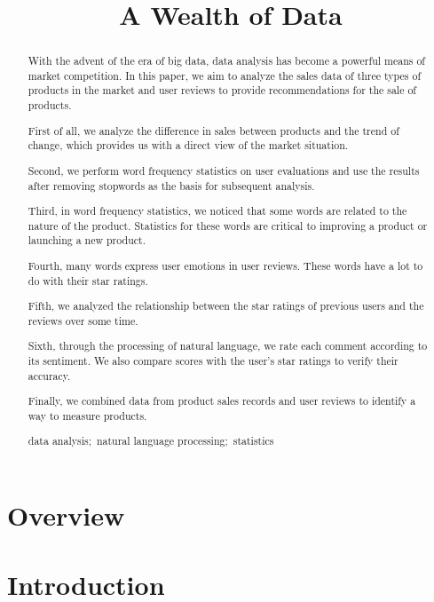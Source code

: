 \documentclass{mcmthesis}
\title{A Wealth of Data}
\begin{document}
	\begin{abstract}
		
		With the advent of the era of big data, data analysis has become a powerful means of market competition. In this paper, we aim to analyze the sales data of three types of products in the market and user reviews to provide recommendations for the sale of products.
		
		First of all, we analyze the difference in sales between products and the trend of change, which provides us with a direct view of the market situation.
		
		Second, we perform word frequency statistics on user evaluations and use the results after removing stopwords as the basis for subsequent analysis.
		
		Third, in word frequency statistics, we noticed that some words are related to the nature of the product. Statistics for these words are critical to improving a product or launching a new product.
		
		Fourth, many words express user emotions in user reviews. These words have a lot to do with their star ratings.
		
		Fifth, we analyzed the relationship between the star ratings of previous users and the reviews over some time.
		
		Sixth, through the processing of natural language, we rate each comment according to its sentiment. We also compare scores with the user's star ratings to verify their accuracy.
		
		Finally, we combined data from product sales records and user reviews to identify a way to measure products.
		\begin{keywords}
			data analysis;\ natural language processing;\ statistics
		\end{keywords}
	\end{abstract}
	\maketitle
	\newpage
	\tableofcontents
	\newpage
	
	\section{Overview}


	\section{Introduction}
	
\end{document}

